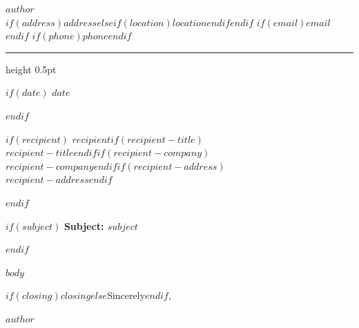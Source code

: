 \documentclass[11pt,letterpaper]{article}
\newcommand{\sep}{\enspace{\color{rulecolor}\textbullet}\enspace}
\begin{document}
\begin{flushleft}
  {\large\bfseries\color{headingcolor} $author$}\\[0.15em]
  {\small\color{mutedcolor}
    $if(address)$$address$$else$$if(location)$$location$$endif$$endif$%
    $if(email)$\sep\href{mailto:$email$}{$email$}$endif$%
    $if(phone)$\sep$phone$$endif$%
  }
\end{flushleft}

\vspace{0.3em}
{\color{rulecolor}\hrule height 0.5pt}
\vspace{1.2em}

$if(date)$
$date$

$endif$

$if(recipient)$
$recipient$$if(recipient-title)$\\$recipient-title$$endif$$if(recipient-company)$\\$recipient-company$$endif$$if(recipient-address)$\\$recipient-address$$endif$

$endif$

$if(subject)$
\textbf{Subject: $subject$}

$endif$

$body$

\vspace{1.5em}
$if(closing)$$closing$$else$Sincerely$endif$,

\vspace{2.5em}
$author$
\end{document}
